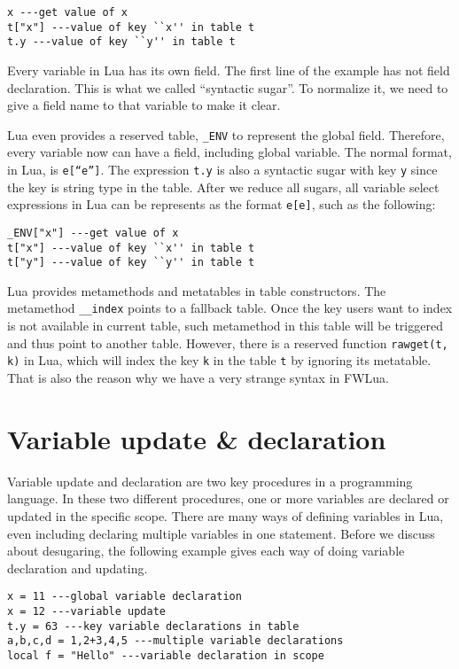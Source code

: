 \begin{verbatim}
x ---get value of x
t["x"] ---value of key ``x'' in table t
t.y ---value of key ``y'' in table t
\end{verbatim}

Every variable in Lua has its own field. 
The first line of the example has not field declaration. This is what we called ``syntactic sugar''. To normalize it, we need to give a field name to that variable to make it clear.

Lua even provides a reserved table, {\tt \_ENV} to represent the global field. Therefore, every variable now can have a field, including global variable. The normal format, in Lua, is {\tt e[``e'']}. 
The expression {\tt t.y} is also a syntactic sugar with key {\tt y} since the key is string type in the table. After we reduce all sugars, all variable select expressions in Lua can be represents as the format {\tt e[e]}, such as the following:

\begin{verbatim}
_ENV["x"] ---get value of x
t["x"] ---value of key ``x'' in table t
t["y"] ---value of key ``y'' in table t
\end{verbatim}

Lua provides metamethods and metatables in table constructors. The metamethod {\tt \_\_index} points to a fallback table. Once the key users want to index is not available in current table, such metamethod in this table will be triggered and thus point to another table. However, there is a reserved function {\tt rawget(t, k)} in Lua, which will index the key {\tt k} in the table {\tt t} by ignoring its metatable. That is also the reason why we have a very strange syntax in FWLua.

\section{Variable update \& declaration}
Variable update and declaration are two key procedures in a programming language. 
In these two different procedures, one or more variables are declared or updated in the specific scope. There are many ways of defining variables in Lua, even including declaring multiple variables in one statement. Before we discuss about desugaring, the following example gives each way of doing variable declaration and updating.

\begin{verbatim}
x = 11 ---global variable declaration
x = 12 ---variable update
t.y = 63 ---key variable declarations in table
a,b,c,d = 1,2+3,4,5 ---multiple variable declarations
local f = "Hello" ---variable declaration in scope
\end{verbatim}

